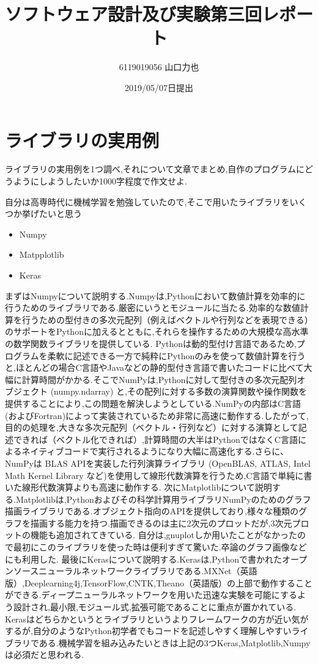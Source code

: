 \documentclass{jarticle}
\title{ソフトウェア設計及び実験第三回レポート\\}
\author{6119019056 山口力也}
\date{2019/05/07日提出}
\begin{document}
\maketitle
\section{ライブラリの実用例}
ライブラリの実用例を1つ調べ,それについて文章でまとめ,自作のプログラムにどうようにしようしたいか1000字程度で作文せよ.

自分は高専時代に機械学習を勉強していたので,そこで用いたライブラリをいくつか挙げたいと思う

\begin{itemize}

\item Numpy
\item Matpplotlib
\item Keras

\end{itemize}

まずはNumpyについて説明する.Numpyは,Pythonにおいて数値計算を効率的に行うためのライブラリである.厳密にいうとモジュールに当たる.効率的な数値計算を行うための型付きの多次元配列（例えばベクトルや行列などを表現できる）のサポートをPythonに加えるとともに,それらを操作するための大規模な高水準の数学関数ライブラリを提供している.
Pythonは動的型付け言語であるため,プログラムを柔軟に記述できる一方で純粋にPythonのみを使って数値計算を行うと,ほとんどの場合C言語やJavaなどの静的型付き言語で書いたコードに比べて大幅に計算時間がかかる.そこでNumPyは,Pythonに対して型付きの多次元配列オブジェクト (numpy.ndarray) と,その配列に対する多数の演算関数や操作関数を提供することにより,この問題を解決しようとしている.NumPyの内部はC言語 (およびFortran)によって実装されているため非常に高速に動作する.したがって,目的の処理を,大きな多次元配列（ベクトル・行列など）に対する演算として記述できれば（ベクトル化できれば）,計算時間の大半はPythonではなくC言語によるネイティブコードで実行されるようになり大幅に高速化する.さらに、NumPyは BLAS APIを実装した行列演算ライブラリ (OpenBLAS, ATLAS, Intel Math Kernel Library など)を使用して線形代数演算を行うため,C言語で単純に書いた線形代数演算よりも高速に動作する.
次にMatplotlibについて説明する.Matplotlibは,Pythonおよびその科学計算用ライブラリNumPyのためのグラフ描画ライブラリである.オブジェクト指向のAPIを提供しており,様々な種類のグラフを描画する能力を持つ.描画できるのは主に2次元のプロットだが,3次元プロットの機能も追加されてきている.
自分は,gnuplotしか用いたことがなかったので最初にこのライブラリを使った時は便利すぎて驚いた.卒論のグラフ画像などにも利用した.
最後にKerasについて説明する.Kerasは,Pythonで書かれたオープンソースニューラルネットワークライブラリである.MXNet（英語版）,Deeplearning4j,TensorFlow,CNTK,Theano（英語版）の上部で動作することができる.ディープニューラルネットワークを用いた迅速な実験を可能にするよう設計され,最小限,モジュール式,拡張可能であることに重点が置かれている.
Kerasはどちらかというとライブラリというよりフレームワークの方が近い気がするが,自分のようなPython初学者でもコードを記述しやすく理解しやすいライブラリである.機械学習を組み込みたいときは上記の3つKeras,Matplotlib,Numpyは必須だと思われる.
\end{document}
